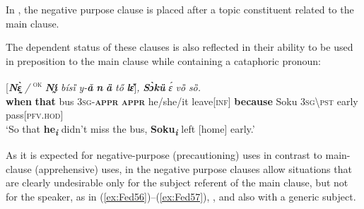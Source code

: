 \documentclass[output=paper,colorlinks,citecolor=brown]{langscibook}
\begin{document}
 In , the negative purpose clause is placed after a topic constituent related to the main clause.

\ea \label{ex:Fed60}
\z
\z


 The dependent status of these clauses is also reflected in their ability to be used in preposition to the main clause while containing a cataphoric pronoun:

\ea \label{ex:Fed61}
\gll \textup{[}\textit{\textbf{Nɛ̰̀}} \textit{/} \textsuperscript{\textsc{ok}} \textit{\textbf{Nı̰́}} \textit{bísȉ} \textit{y-\textbf{ǎ}} \textit{\textbf{n{\ù}}} \textbf{\textit{ȁ}} \textit{tő} \textit{\textbf{lɛ̌}}\textup{]}\textit{,} \textbf{\textit{Sɔ̀kȕ}} \textit{ɛ́} \textit{vȍ} \textit{sȍ.} \\
\textbf{when} {} {} \textbf{that} bus \textsc{3sg-\textbf{appr}} \textsc{\textbf{appr}} he/she/it leave[\textsc{inf}] \textbf{because} Soku \textsc{3sg\backslash pst} early pass[\textsc{pfv.hod}] \\
\glt `So that \textbf{he}\textsubscript{\textit{\textbf{i}}} didn't miss the bus, \textbf{Soku}\textsubscript{\textit{\textbf{i}}} left [home] early.'
\z


 As it is expected for negative-purpose (precautioning) uses in contrast to main-clause (apprehensive) uses, in  the negative purpose clauses allow situations that are clearly undesirable only for the subject referent of the main clause, but not for the speaker, as in (\ref{ex:Fed56})--(\ref{ex:Fed57}), , and also  with a generic subject.
\end{document}
